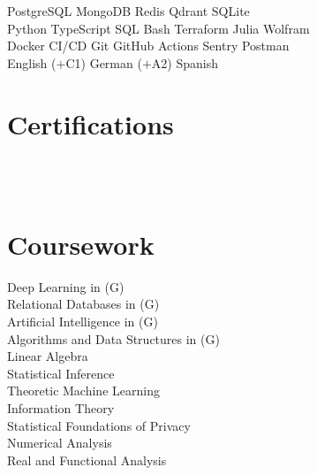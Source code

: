 \documentclass{tex/deedy-resume-openfont}
\begin{document}
\begin{minipage}[t]{0.32\textwidth}
PostgreSQL \textbullet{} 
MongoDB \textbullet{} 
Redis \textbullet{} 
Qdrant \textbullet{} 
SQLite \\[4pt]

Python \textbullet{} 
TypeScript \textbullet{} 
SQL \textbullet{} 
Bash \textbullet{} 
Terraform \textbullet{} 
Julia \textbullet{} 
Wolfram \\[4pt]

Docker \textbullet{} 
CI/CD \textbullet{}
Git \textbullet{} 
GitHub Actions \textbullet{} 
Sentry \textbullet{} 
Postman \\[4pt]

English ($+$C1) \textbullet{} German ($+$A2) \textbullet{} Spanish\\[4pt]


\section{Certifications}
\href{https://www.credly.com/users/danivpv}{}\\
\href{https://www.credly.com/users/danivpv}{}\\[4pt]


\section{Coursework}
Deep Learning in (G)\\
Relational Databases in  (G)\\
Artificial Intelligence in  (G)\\
Algorithms and Data Structures in  (G)\\
Linear Algebra\\[4pt]

Statistical Inference\\
Theoretic Machine Learning\\
Information Theory\\
Statistical Foundations of Privacy\\
Numerical Analysis \\
Real and Functional Analysis


%
%

\end{minipage} 
\end{document}
